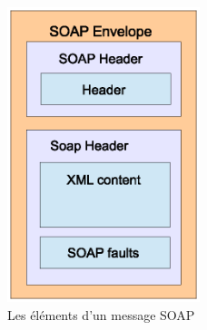 \begin{figure}[h]
    \centering
    \includegraphics[width=0.5\textwidth]{figs/soap_structure.eps}
    \caption{ Les éléments d'un message \textsc{SOAP}}
\end{figure}



